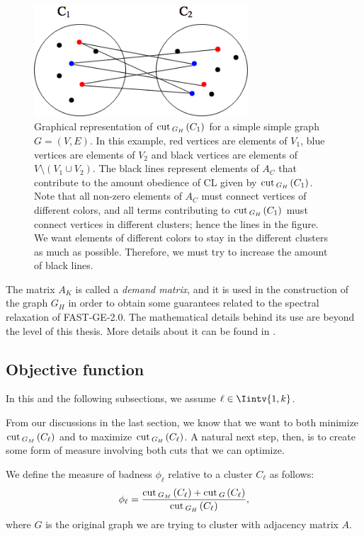 \begin{figure}
\begin{center}
\includegraphics[width=8cm]{figures/gh.png}
\end{center}
   \caption[Graphical representation of $\cut_{G_H\,}(C_1)$ for a simple graph $G=(V,E)$]{Graphical representation of $\cut _{G_H\,}(C_1)$ for a simple simple graph $G = (V,E)$.  In this example, red vertices are elements of $V_1$, blue vertices are elements of $V_2$ and black vertices are elements of $V \setminus (V_1 \cup V_2)$. The black lines represent elements of $A_C$ that contribute to the amount obedience of CL given by $\cut _{G_H\,}(C_1)$. Note that all non-zero elements of $A_C$ must connect vertices of different colors, and all terms contributing to $\cut _{G_H\,}(C_1)$ must connect vertices in different clusters; hence the lines in the figure. We want elements of different colors to stay in the different clusters as much as possible. Therefore, we must try to increase the amount of black lines.}
\label{gh}
\end{figure}

The matrix $A_K$ is called a \textit{demand matrix}, and it is used in the construction of the graph $G_H$ in order to obtain some guarantees related to the spectral relaxation of FAST-GE-2.0. 
The mathematical details behind its use are beyond the level of this thesis.
More details about it can be found in \cite{fastge1}.


\subsection{Objective function}
In this and the following subsections, we assume $\ell \in \Iintv{1,k}$.

From our discussions in the last section, we know that we want to both minimize $\operatorname{cut\,} _{G_M\,}(C_{\ell})$ and to maximize $\operatorname{cut\,} _{G_H\,}(C_{\ell})$.
A natural next step, then, is to create some form of measure involving both cuts that we can optimize.

\begin{definition}
  We define the measure of badness $\phi_\ell$ relative to a cluster $C_\ell$ as follows:
   \begin{equation}
      \phi_\ell = \frac{\operatorname{cut\,}_{G_M\,} (C_\ell) + \operatorname{cut\,}_{G\,}(C_\ell)}{\operatorname{cut\,}_{G_H\,}(C_\ell)},
   \end{equation}
   where $G$ is the original graph we are trying to cluster with adjacency matrix $A$.
\end{definition}

